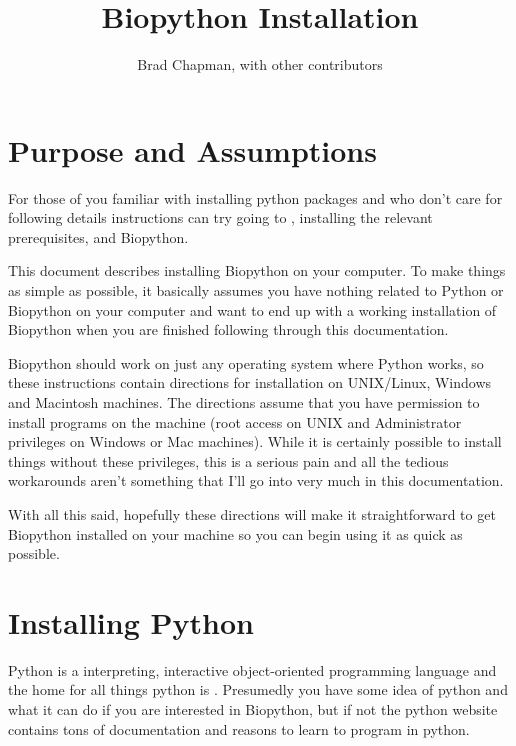 \documentclass{article}
\begin{document}
\title{Biopython Installation}
\author{Brad Chapman, with other contributors}

\maketitle
\tableofcontents

\section{Purpose and Assumptions}

For those of you familiar with installing python packages and who don't
care for following details instructions can try going to
, installing
the relevant prerequisites, and Biopython.

This document describes installing Biopython on your computer. To make
things as simple as possible, it basically assumes you have nothing
related to Python or Biopython on your computer and want to end up with
a working installation of Biopython when you are finished following
through this documentation. 

Biopython should work on just any operating system where Python works,
so these instructions contain directions for installation on UNIX/Linux,
Windows and Macintosh machines. The directions assume 
that you have permission to install programs on the machine
(root access on UNIX and Administrator privileges on Windows or Mac
machines). While it is certainly possible to install things without
these privileges, this is a serious pain and all the tedious workarounds
aren't something that I'll go into very much in this documentation.

With all this said, hopefully these directions will make it
straightforward to get Biopython installed on your machine so you can
begin using it as quick as possible.

\section{Installing Python}

Python is a interpreting, interactive object-oriented programming
language and the home for all things python is
. Presumedly you have some idea of
python and what it can do if you are interested in Biopython, but if not
the python website contains tons of documentation and reasons to learn
to program in python.
\end{document}

